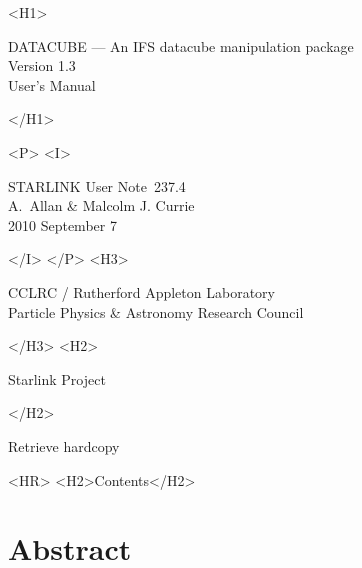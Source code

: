\documentclass[twoside,11pt]{article}
\newcommand{\stardoccategory}  {STARLINK User Note}
\newcommand{\stardocsource}    {sun\stardocnumber}
\newcommand{\stardocnumber}    {237.4}
\newcommand{\stardocauthors}   {A.~Allan \& Malcolm J. Currie}
\newcommand{\stardocdate}      {2010 September 7}
\newcommand{\stardoctitle}     {DATACUBE --- An IFS datacube manipulation package}
\newcommand{\stardocversion}   {Version 1.3}
\newcommand{\stardocmanual}    {User's Manual}
\newcommand{\htmladdnormallink}[2]{#1}
\newcommand{\htmladdimg}[1]{}
\newcommand{\htmlref}[2]{#1}
\newcommand{\htmladdtonavigation}[1]{}
\newcommand{\xlabel}[1]{}
\renewcommand{\_}{\texttt{\symbol{95}}}
\newcommand{\latexonlytoc}[0]{\tableofcontents}
\begin{document}
\begin{htmlonly}
   \xlabel{}
   \begin{rawhtml} <H1> \end{rawhtml}
      \stardoctitle\\
      \stardocversion\\
      \stardocmanual
   \begin{rawhtml} </H1> \end{rawhtml}

   \htmladdimg{sun237_cover.gif}


   \begin{rawhtml} <P> <I> \end{rawhtml}
   \stardoccategory\ \stardocnumber \\
   \stardocauthors \\
   \stardocdate
   \begin{rawhtml} </I> </P> <H3> \end{rawhtml}
      \htmladdnormallink{CCLRC}{http://www.cclrc.ac.uk} /
      \htmladdnormallink{Rutherford Appleton Laboratory}
                        {http://www.cclrc.ac.uk/ral} \\
      \htmladdnormallink{Particle Physics \& Astronomy Research Council}
                        {http://www.pparc.ac.uk} \\
   \begin{rawhtml} </H3> <H2> \end{rawhtml}
      \htmladdnormallink{Starlink Project}{http://www.starlink.ac.uk/}
   \begin{rawhtml} </H2> \end{rawhtml}
   \htmladdnormallink{\htmladdimg{source.gif} Retrieve hardcopy}
      {http://www.starlink.ac.uk/cgi-bin/hcserver?\stardocsource}\\

  \label{stardoccontents}
  \begin{rawhtml}
    <HR>
    <H2>Contents</H2>
  \end{rawhtml}
  \newcommand{\latexonlytoc}[0]{}

  \section{\xlabel{abstract}Abstract}
\end{htmlonly}
\end{document}
